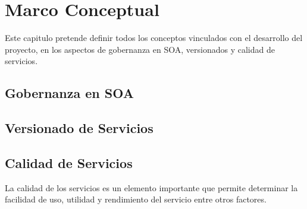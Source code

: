 \documentclass[a4paper,openright,12pt]{report}
\begin{document}
\chapter{Marco Conceptual}
Este capitulo pretende definir todos los conceptos vinculados con el desarrollo del proyecto, en los aspectos de gobernanza en SOA, versionados y calidad de servicios.
\section{Gobernanza en SOA}
\section{Versionado de Servicios}
\section{Calidad de Servicios}
La calidad de los servicios es un elemento importante que permite determinar la facilidad de uso, utilidad y rendimiento del servicio entre otros factores.
\end{document}

